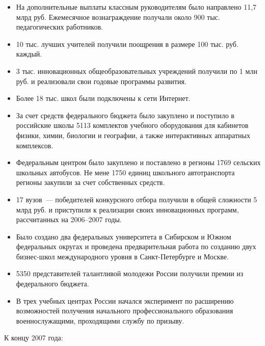 \documentclass[article, 12pt, russian, oneside]{ncc}
\begin{document}
\begin{itemize}
\item На дополнительные выплаты классным руководителям было направлено
  11,7 млрд руб. Ежемесячное вознаграждение получали около 900
  тыс. педагогических работников.
\item 10 тыс. лучших учителей получили поощрения в размере 100
  тыс. руб. каждый.
\item 3 тыс. инновационных общеобразовательных учреждений получили по
  1 млн руб. и реализовали свои годовые программы развития.
\item Более 18 тыс. школ были подключены к сети Интернет.
\item За счет средств федерального бюджета было закуплено и поступило
  в российские школы 5113 комплектов учебного оборудования для
  кабинетов физики, химии, биологии и географии, а также интерактивных
  аппаратных комплексов.
\item Федеральным центром было закуплено и поставлено в регионы 1769
  сельских школьных автобусов. Не мене 1750 единиц школьного
  автотранспорта регионы закупили за счет собственных средств.
\item 17 вузов~--- победителей конкурсного отбора получили в общей
  сложности 5 млрд руб. и приступили к реализации своих инновационных
  программ, рассчитанных на 2006--2007 годы.
\item Было создано два федеральных университета в Сибирском и Южном
  федеральных округах и проведена предварительная работа по созданию
  двух бизнес-школ международного уровня в Санкт-Петербурге и Москве.
\item 5350 представителей талантливой молодежи России получили премии
  из федерального бюджета.
\item В трех учебных центрах России начался эксперимент по расширению
  возможностей получения начального профессионального образования
  военнослужащими, проходящими службу по призыву.
\end{itemize}

К концу 2007 года:
\end{document}

